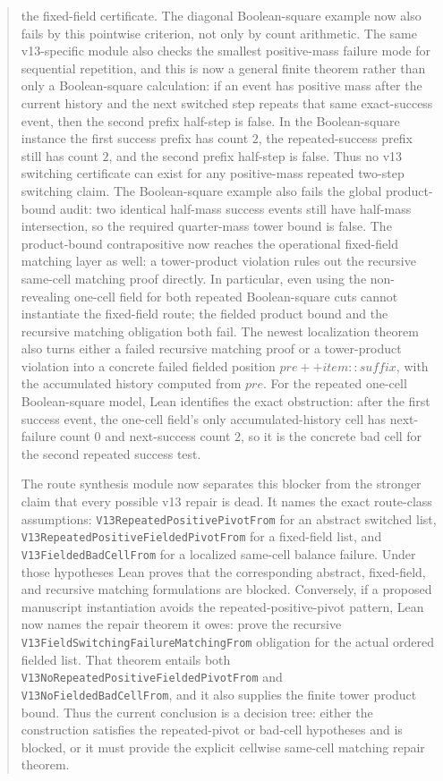 \documentclass[11pt]{article}
\theoremstyle{remark}
\begin{document}
\begin{abstract}
the fixed-field certificate.  The diagonal Boolean-square example now also fails by this pointwise
criterion, not only by count arithmetic.
The same v13-specific module also checks the smallest
positive-mass failure mode for sequential repetition, and this is now a general finite theorem
rather than only a Boolean-square calculation: if an event has positive mass after the current
history and the next switched step repeats that same exact-success event, then the second prefix
half-step is false.  In the Boolean-square instance the first success prefix has count \(2\), the
repeated-success prefix still has count \(2\), and the second prefix half-step is false.  Thus no
v13 switching certificate can exist for any positive-mass repeated two-step switching claim.  The
Boolean-square example also fails the global product-bound audit: two identical half-mass success
events still have half-mass intersection, so the required quarter-mass tower bound is false.  The
product-bound contrapositive now reaches the
operational fixed-field matching layer as well: a tower-product violation rules out the recursive
same-cell matching proof directly.  In particular, even using the non-revealing one-cell field for
both repeated Boolean-square cuts cannot instantiate the fixed-field route; the fielded product
bound and the recursive matching obligation both fail.  The newest localization theorem also
turns either a failed recursive matching proof or a tower-product violation into a concrete failed
fielded position \(pre ++ item :: suffix\), with the accumulated history computed from \(pre\).
For the repeated one-cell Boolean-square model, Lean identifies the exact obstruction: after the
first success event, the one-cell field's only accumulated-history cell has next-failure count
\(0\) and next-success count \(2\), so it is the concrete bad cell for the second repeated success
test.

The route synthesis module now separates this blocker from the stronger claim that every possible
v13 repair is dead.  It names the exact route-class assumptions:
\texttt{V13RepeatedPositivePivotFrom} for an abstract switched list,
\texttt{V13RepeatedPositiveFieldedPivotFrom} for a fixed-field list, and
\texttt{V13FieldedBadCellFrom} for a localized same-cell balance failure.  Under those hypotheses
Lean proves that the corresponding abstract, fixed-field, and recursive matching formulations are
blocked.  Conversely, if a proposed manuscript instantiation avoids the repeated-positive-pivot
pattern, Lean now names the repair theorem it owes: prove the recursive
\texttt{V13FieldSwitchingFailureMatchingFrom} obligation for the actual ordered fielded list.  That
theorem entails both \texttt{V13NoRepeatedPositiveFieldedPivotFrom} and
\texttt{V13NoFieldedBadCellFrom}, and it also supplies the finite tower product bound.  Thus the
current conclusion is a decision tree: either the construction satisfies the repeated-pivot or
bad-cell hypotheses and is blocked, or it must provide the explicit cellwise same-cell matching
repair theorem.


\end{abstract}
\end{document}
